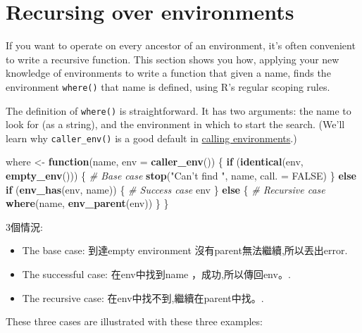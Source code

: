 \documentclass[]{book}
\newenvironment{Shaded}{\begin{snugshade}}{\end{snugshade}}
\newcommand{\KeywordTok}[1]{\textcolor[rgb]{0.13,0.29,0.53}{\textbf{#1}}}
\newcommand{\DataTypeTok}[1]{\textcolor[rgb]{0.13,0.29,0.53}{#1}}
\newcommand{\StringTok}[1]{\textcolor[rgb]{0.31,0.60,0.02}{#1}}
\newcommand{\CommentTok}[1]{\textcolor[rgb]{0.56,0.35,0.01}{\textit{#1}}}
\newcommand{\OtherTok}[1]{\textcolor[rgb]{0.56,0.35,0.01}{#1}}
\newcommand{\ControlFlowTok}[1]{\textcolor[rgb]{0.13,0.29,0.53}{\textbf{#1}}}
\newcommand{\NormalTok}[1]{#1}
\theoremstyle{definition}
\theoremstyle{definition}
\theoremstyle{definition}
\theoremstyle{remark}
\begin{document}
\hypertarget{env-recursion}{\section{Recursing over
environments}\label{env-recursion}}

If you want to operate on every ancestor of an environment, it's often
convenient to write a recursive function. This section shows you how,
applying your new knowledge of environments to write a function that
given a name, finds the environment \texttt{where()} that name is
defined, using R's regular scoping rules.

The definition of \texttt{where()} is straightforward. It has two
arguments: the name to look for (as a string), and the environment in
which to start the search. (We'll learn why \texttt{caller\_env()} is a
good default in \protect\hyperlink{calling-environments}{calling
environments}.)

\begin{Shaded}
\begin{Highlighting}[]
\NormalTok{where <-}\StringTok{ }\ControlFlowTok{function}\NormalTok{(name, }\DataTypeTok{env =} \KeywordTok{caller_env}\NormalTok{()) \{}
  \ControlFlowTok{if}\NormalTok{ (}\KeywordTok{identical}\NormalTok{(env, }\KeywordTok{empty_env}\NormalTok{())) \{}
    \CommentTok{# Base case}
    \KeywordTok{stop}\NormalTok{(}\StringTok{"Can't find "}\NormalTok{, name, }\DataTypeTok{call. =} \OtherTok{FALSE}\NormalTok{)}
\NormalTok{  \} }\ControlFlowTok{else} \ControlFlowTok{if}\NormalTok{ (}\KeywordTok{env_has}\NormalTok{(env, name)) \{}
    \CommentTok{# Success case}
\NormalTok{    env}
\NormalTok{  \} }\ControlFlowTok{else}\NormalTok{ \{}
    \CommentTok{# Recursive case}
    \KeywordTok{where}\NormalTok{(name, }\KeywordTok{env_parent}\NormalTok{(env))}
\NormalTok{  \}}
\NormalTok{\}}
\end{Highlighting}
\end{Shaded}

3個情況:

\begin{itemize}
\item
  The base case: 到達empty environment 沒有parent無法繼續,所以丟出error.
\item
  The successful case: 在env中找到name ，成功,所以傳回env。.
\item
  The recursive case: 在env中找不到,繼續在parent中找。.
\end{itemize}

These three cases are illustrated with these three examples:
\end{document}
